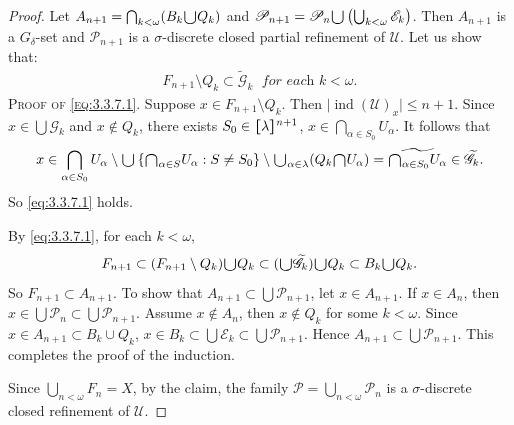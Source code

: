 \documentclass[ch3.tex]{subfiles}
\begin{document}
\begin{proof}
Let $A_{n+1} = \bigcap_{k < \omega} (B_k \raisebox{-2pt}{\scalebox{1.5}{$\cup$}} Q_k)$ and 
$\mathscr{P}_{n+1} = \mathscr{P}_n \raisebox{-2pt}{\scalebox{1.5}{$\cup$}}
 \left( \bigcup_{k < \omega} \mathscr{E}_k \right)$. 
Then $A_{n+1}$ is a $G_\delta$-set and $\mathscr{P}_{n+1}$ is a 
$\sigma$-discrete closed partial refinement of $\mathscr{U}$. Let us show that:
\begin{gather}
F_{n+1} \setminus Q_k \subset \widetilde{\mathscr{G}}_k \; \textit{ for each }  k < \omega. \label{eq:3.3.7.1}
\end{gather}
\textsc{Proof of \eqref{eq:3.3.7.1}.} Suppose $x \in F_{n+1} \setminus Q_k$. Then 
$\vert{}\operatorname{ind}(\mathscr{U})_x\vert{} \le n+1$. 
Since $x \in \bigcup \mathscr{G}_k$ and $x \notin Q_k$, there exists 
$S_0 \in \hstretch{1.8}{[}\lambda\hstretch{1.8}{]}^{n+1}$,  
$x \in \bigcap_{\alpha \in S_0} U_\alpha$. It follows that
\begin{gather}
x \in \bigcap_{\alpha \in S_0} U_\alpha 
\setminus \raisebox{-2pt}{\scalebox{1.5}{$\cup$}} \left\{ \raisebox{-2pt}{\scalebox{1.5}{$\cap$}}_{\alpha \in S} U_\alpha: S\neq S_0 \right\} 
\setminus \raisebox{-2pt}{\scalebox{1.5}{$\cup$}}_{\alpha \in \lambda} 
(Q_k \raisebox{-2pt}{\scalebox{1.5}{$\cap$}} U_\alpha)
= \widetilde{\raisebox{-2pt}{\scalebox{1.5}{$\cap$}}_{\alpha \in S_0} U_\alpha} \in \widetilde{\mathscr{G}}_k. \label{eq:3.3.7.2}
\end{gather}
\noindent So \eqref{eq:3.3.7.1} holds.

By \eqref{eq:3.3.7.1}, for each $k < \omega$,
$$F_{n+1} \subset (F_{n+1} \setminus Q_k) \raisebox{-2pt}{\scalebox{1.5}{$\cup$}} Q_k \subset
(\raisebox{-2pt}{\scalebox{1.5}{$\cup$}} \widetilde{\mathscr{G}}_k) 
\raisebox{-2pt}{\scalebox{1.5}{$\cup$}} Q_k \subset B_k \raisebox{-2pt}{\scalebox{1.5}{$\cup$}} Q_k.$$
So $F_{n+1} \subset A_{n+1}$. 
To show that $A_{n+1} \subset \bigcup \mathscr{P}_{n+1}$, 
let $x \in A_{n+1}$. If $x \in A_n$, then 
$x \in \bigcup \mathscr{P}_n \subset \bigcup \mathscr{P}_{n+1}$. 
Assume $x \notin A_n$, then $x \notin Q_k$ for some $k < \omega$. 
Since $x \in A_{n+1} \subset B_k \cup Q_k$, 
$x \in B_k \subset \bigcup \mathscr{E}_k \subset \bigcup \mathscr{P}_{n+1}$. 
Hence $A_{n+1} \subset \bigcup \mathscr{P}_{n+1}$. 
This completes the proof of the induction.

Since $\bigcup_{n < \omega} F_n = X$, by the claim, the family 
$\mathscr{P} = \bigcup_{n < \omega} \mathscr{P}_n$ is a 
$\sigma$-discrete closed refinement of $\mathscr{U}$. 
\end{proof}
\end{document}
